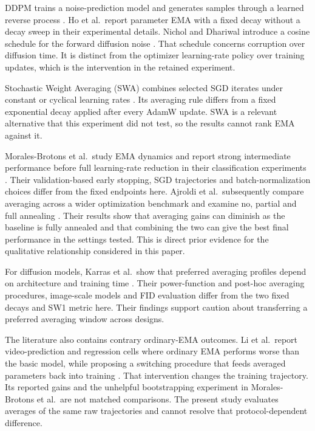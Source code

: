 DDPM trains a noise-prediction model and generates samples through a learned
reverse process \cite{Ho2020}. Ho et al.\ report parameter EMA with a fixed
decay without a decay sweep in their experimental details. Nichol and
Dhariwal introduce a cosine schedule for the forward diffusion noise
\cite{Nichol2021}. That schedule concerns corruption over diffusion time. It
is distinct from the optimizer learning-rate policy over training updates,
which is the intervention in the retained experiment.

Stochastic Weight Averaging (SWA) combines selected SGD iterates under constant
or cyclical learning rates \cite{Izmailov2018}. Its averaging rule differs
from a fixed exponential decay applied after every AdamW update. SWA is a
relevant alternative that this experiment did not test, so the results cannot
rank EMA against it.

Morales-Brotons et al.\ study EMA dynamics and report strong intermediate
performance before full learning-rate reduction in their classification
experiments \cite{MoralesBrotons2024}. Their validation-based early stopping,
SGD trajectories and batch-normalization choices differ from the fixed
endpoints here. Ajroldi et al.\ subsequently compare averaging across a wider
optimization benchmark and examine no, partial and full annealing
\cite{Ajroldi2025}. Their results show that averaging gains can diminish as
the baseline is fully annealed and that combining the two can give the best
final performance in the settings tested. This is direct prior evidence for
the qualitative relationship considered in this paper.

For diffusion models, Karras et al.\ show that preferred averaging profiles
depend on architecture and training time \cite{Karras2024}. Their
power-function and post-hoc averaging procedures, image-scale models and FID
evaluation differ from the two fixed decays and SW1 metric here. Their findings
support caution about transferring a preferred averaging window across designs.

The literature also contains contrary ordinary-EMA outcomes. Li et al.\ report
video-prediction and regression cells where ordinary EMA performs worse than
the basic model, while proposing a switching procedure that feeds averaged
parameters back into training \cite{Li2024}. That intervention changes the
training trajectory. Its reported gains and the unhelpful bootstrapping
experiment in Morales-Brotons et al.\ are not matched comparisons. The present
study evaluates averages of the same raw trajectories and cannot resolve that
protocol-dependent difference.
